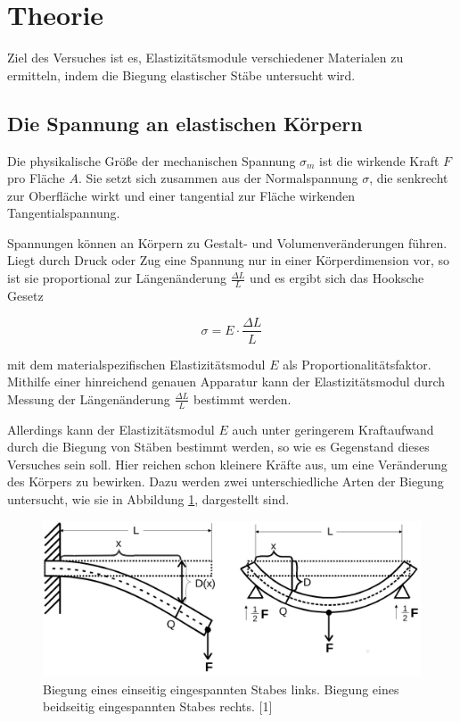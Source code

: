 \section{Theorie}
\label{sec:Theorie}

Ziel des Versuches ist es, Elastizitätsmodule verschiedener Materialen
zu ermitteln, indem die Biegung elastischer Stäbe untersucht wird.

\subsection{Die Spannung an elastischen Körpern}

Die physikalische Größe der mechanischen Spannung $\sigma_m$ ist die wirkende
Kraft $F$ pro Fläche $A$. Sie setzt sich zusammen aus der Normalspannung $\sigma$,
die senkrecht zur Oberfläche wirkt und einer tangential zur Fläche wirkenden
Tangentialspannung.

Spannungen können an Körpern zu Gestalt- und Volumenveränderungen
führen. Liegt durch Druck oder Zug eine Spannung nur in einer Körperdimension vor, 
so ist sie proportional zur Längenänderung $\frac{\Delta L}{L}$ und es ergibt sich
das Hooksche Gesetz

\begin{equation}
    \sigma = E \cdot \frac{\Delta L}{L}
\end{equation}

mit dem materialspezifischen Elastizitätsmodul $E$ als Proportionalitätsfaktor.
Mithilfe einer hinreichend genauen Apparatur kann der Elastizitätsmodul durch
Messung der Längenänderung $\frac{\Delta L}{L}$ bestimmt werden.

Allerdings kann der Elastizitätsmodul $E$ auch unter geringerem Kraftaufwand
durch die Biegung von Stäben bestimmt werden, so wie es Gegenstand dieses
Versuches sein soll. Hier reichen schon kleinere Kräfte aus, um eine Veränderung 
des Körpers zu bewirken. Dazu werden zwei unterschiedliche Arten der Biegung
untersucht, wie sie in Abbildung \ref{fig:abb1}, dargestellt sind.

\begin{figure}
    \centering
    \includegraphics[scale=0.2]{content/Biegungen.png}
    \caption{Biegung eines einseitig eingespannten Stabes links.\newline
    Biegung eines beidseitig eingespannten Stabes rechts. [1]}
    \label{fig:abb1}
\end{figure}

